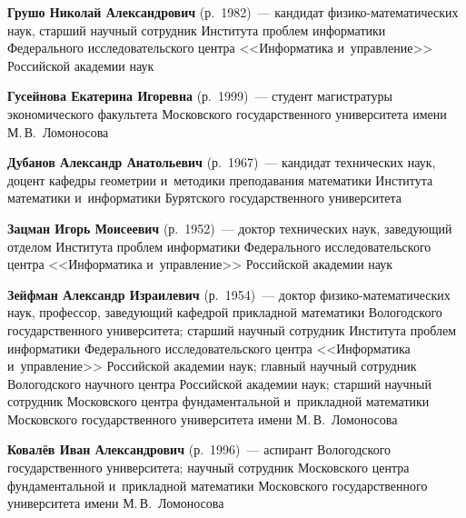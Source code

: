 \begin{multicols}{2}
\noindent
\textbf{Грушо Николай Александрович} (р.\ 1982)~--- кандидат фи\-зи\-ко-ма\-те\-ма\-ти\-че\-ских наук, 
старший научный сотрудник Института проб\-лем информатики Федерального исследовательского цент\-ра <<Информатика и~управ\-ле\-ние>>
 Российской академии наук

\vspace*{4pt}
 
 \noindent
\textbf{Гусейнова Екатерина Игоревна} (р.\ 1999)~--- студент магистратуры экономического факультета Мос\-ков\-ско\-го 
государственного университета имени М.\,В.~Ломоносова

\vspace*{4pt}

\noindent
\textbf{Дубанов Александр Анатольевич} (р.\ 1967)~--- 
кандидат технических наук, доцент ка\-фед\-ры гео\-мет\-рии и~методики преподавания математики Института математики 
и~информатики Бурятского государственного университета

\vspace*{4pt}

\noindent
\textbf{Зацман Игорь Моисеевич} (р.\ 1952)~--- доктор технических наук, 
заведующий отделом Института проб\-лем информатики Федерального исследовательского цент\-ра <<Информатика и~управ\-ле\-ние>>
 \mbox{Российской} академии наук

\vspace*{4pt}

\noindent
\textbf{Зейфман Александр Израилевич} (р.\ 1954)~--- доктор фи\-зи\-ко-ма\-те\-ма\-ти\-че\-ских наук, 
профессор, за\-ве\-ду\-ющий ка\-фед\-рой прикладной математики Вологодского государственного университета;
 старший научный сотрудник Института проб\-лем информатики Федерального исследовательского цент\-ра <<Информатика и~управ\-ле\-ние>>
  Российской академии наук; главный научный сотрудник Вологодского научного центра Российской академии наук; 
  старший научный сотрудник Московского центра фундаментальной и~при\-клад\-ной математики Московского государственного университета имени М.\,В.~Ломоносова


\vspace*{4pt}


\noindent
\textbf{Ковалёв Иван Александрович} (р.\ 1996)~--- 
аспирант Вологодского государственного университета; научный сотрудник Московского центра фундаментальной и~при\-клад\-ной 
математики Московского государственного университета имени М.\,В.~Ломоносова

\vspace*{4pt}


\end{multicols}

